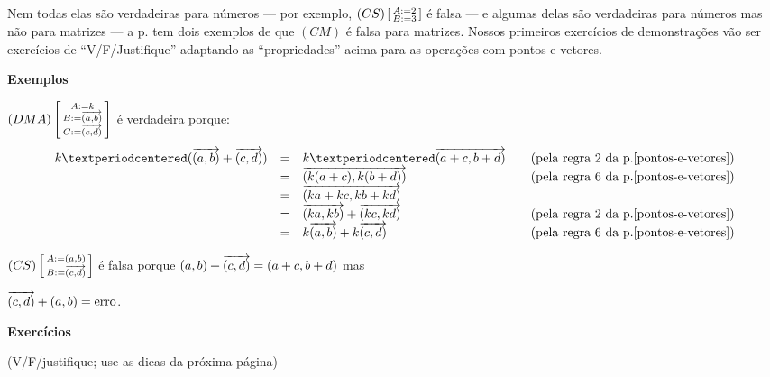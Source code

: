 \documentclass[oneside]{book}
\begin{document}
Nem todas elas são verdadeiras para números --- por exemplo, $(CS)
\left[\begin {smallmatrix}A:=2\\B:=3\end{smallmatrix}\right]$ é falsa --- e algumas delas são verdadeiras para
números mas não para matrizes --- a p.\pageref{matrizes} tem dois
exemplos de que $(CM)$ é falsa para matrizes. Nossos primeiros
exercícios de demonstrações vão ser exercícios de ``V/F/Justifique''
adaptando as ``propriedades'' acima para as operações com pontos e
vetores.

\msk

{\bf Exemplos}

$(DMA)\left[\begin {smallmatrix}A:=k \\ B:={\overrightarrow{(a,b)}} \\ C:={\overrightarrow{(c,d)}}\end{smallmatrix}\right]$ é verdadeira porque:
%
$$\def\pr#1{\text{(pela regra #1 da p.\pageref{pontos-e-vetores})}}
  \begin{array}{rclcl}
  k·(\vab+\vcd) &=& k·\VEC{a+c,b+d}           && \pr2 \\
                &=& \VEC{k(a+c),k(b+d)}       && \pr6 \\
                &=& \VEC{ka+kc,kb+kd}         && \\
                &=& \VEC{ka,kb} + \VEC{kc,kd} && \pr2 \\
                &=& k\vab + k\vcd             && \pr6 \\
  \end{array}
$$

$(CS)\left[\begin {smallmatrix}A:=(a,b) \\ B:={\overrightarrow{(c,d)}}\end{smallmatrix}\right]$ é falsa porque $(a,b) + {\overrightarrow{(c,d)}} =
  (a+c,b+d)$ mas

${\overrightarrow{(c,d)}}+(a,b) = \text{erro}$.

\msk

{\bf Exercícios}

(V/F/justifique; use as dicas da próxima página)
\end{document}
